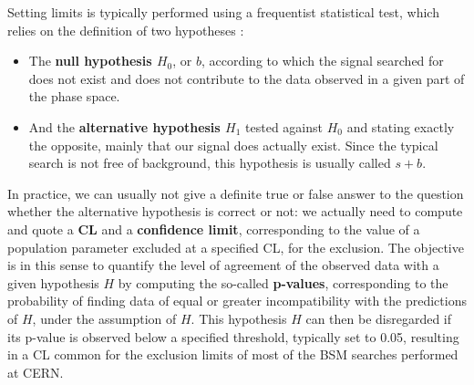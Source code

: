 \documentclass[a4paper, 10pt, openright]{report}
\begin{document}
Setting limits is typically performed using a frequentist statistical test, which relies on the definition of two hypotheses \cite{stat1, stat2}: 
 
\begin{itemize} 
\item The \textbf{null hypothesis $H_0$}, or $b$, according to which the signal searched for does not exist and does not contribute to the data observed in a given part of the phase space.
\item And the \textbf{alternative hypothesis $H_1$} tested against $H_0$ and stating exactly the opposite, mainly that our signal does actually exist. Since the typical search
is not free of background, this hypothesis is usually called $s+b$.
\end{itemize}

In practice, we can usually not give a definite true or false answer to the question whether the alternative hypothesis is correct or not: we actually need to compute and quote a \textbf{\acf{CL}} and a \textbf{confidence limit}, corresponding to the value of a population parameter excluded at a specified \ac{CL}, for the exclusion. The objective is in this sense to quantify the level of agreement of the observed data with a given hypothesis $H$ by computing the so-called \textbf{p-values}, corresponding to the probability of finding data of equal or greater incompatibility with the predictions of $H$, under the assumption of $H$. This hypothesis $H$ can then be disregarded if its p-value is observed below a specified threshold, typically set to 0.05, resulting in a \ac{CL} common for the exclusion limits of most of the \ac{BSM} searches performed at \ac{CERN}.

%
%
%
\end{document}
